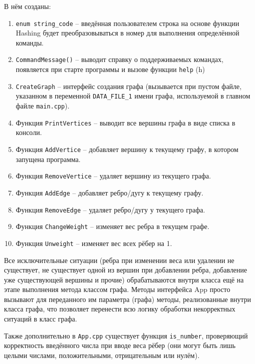 \documentclass[otchet]{SCWorks}
\begin{document}
В нём созданы:
\begin{enumerate}
\item \texttt{enum string\_code} -- введённая пользователем строка на основе функции Hashing будет преобразовываться в номер для выполнения определённой команды.
\item \texttt{CommandMessage()} -- выводит справку о поддерживаемых командах, появляется при старте программы и вызове функции \texttt{help} (h)
\item \texttt{CreateGraph} -- интерфейс создания графа (вызывается при пустом файле, указанном в переменной \texttt{DATA\_FILE\_1} имени графа, используемой в главном файле \texttt{main.cpp}).
\item Функция \texttt{PrintVertices} -- выводит все вершины графа в виде списка в консоли.
\item Функция \texttt{AddVertice} -- добавляет вершину к текущему графу, в котором запущена программа.
\item Функция \texttt{RemoveVertice} -- удаляет вершину из текущего графа.
\item Функция \texttt{AddEdge} -- добавляет ребро/дугу к текущему графу.
\item Функция \texttt{RemoveEdge} -- удаляет ребро/дугу у текущего графа.
\item Функция \texttt{ChangeWeight} -- изменяет вес ребра в текущем графе.
\item Функция \texttt{Unweight} -- изменяет вес всех рёбер на 1.
\end{enumerate}

Все исключительные ситуации (ребра при изменении веса или удалении не существует, не существует одной из вершин при добавлении ребра, добавление уже существующей вершины и прочие) обрабатываются внутри класса ещё на этапе выполнения метода классом графа. Методы интерфейса App просто вызывают для переданного им параметра (графа) методы, реализованные внутри класса графа, что позволяет перенести всю логику обработки некорректных ситуаций в класс графа.

Также дополнительно в \texttt{App.cpp} существует функция \texttt{is\_number}, проверяющий корректность введённого числа при вводе веса рёбер (они могут быть лишь целыми числами, положительными, отрицательным или нулём).
\end{document}
